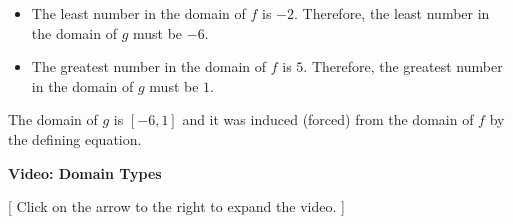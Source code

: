 \documentclass{ximera}
\begin{document}
\begin{enumerate}
\begin{itemize}
\item The least number in the domain of $f$ is $-2$.  Therefore, the least number in the domain of $g$ must be $-6$.
\item The greatest number in the domain of $f$ is $5$.  Therefore, the greatest number in the domain of $g$ must be $1$.
\end{itemize} 

The domain of $g$ is $[-6, 1]$ and it was induced (forced) from the domain of $f$ by the defining equation.


\end{enumerate}






\begin{explanation} \textbf{\textcolor{red!75!green}{Video: Domain Types}}

[ Click on the arrow to the right to expand the video. ]
\begin{expandable} 

\begin{center}
\end{center}

\end{expandable}
\end{explanation}
\end{document}
